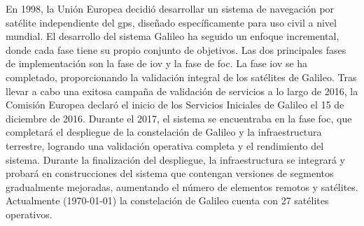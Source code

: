 \begin{justify}
    En 1998, la Unión Europea decidió desarrollar un sistema de navegación por satélite independiente del \gls{gps}, diseñado específicamente
    para uso civil a nivel mundial. El desarrollo del sistema Galileo ha seguido un enfoque incremental, donde cada fase tiene su propio conjunto de objetivos. Las dos principales
    fases de implementación son la fase de \gls{iov} y la fase de \gls{foc}. La fase \gls{iov} se ha completado, proporcionando la validación
    integral de los satélites de Galileo. Tras llevar a cabo una exitosa campaña de validación de servicios a lo largo de 2016, la Comisión
    Europea declaró el inicio de los Servicios Iniciales de Galileo el 15 de diciembre de 2016. Durante el 2017, el sistema se encuentraba en la fase \gls{foc}, que completará el
    despliegue de la constelación de Galileo y la infraestructura terrestre, logrando una validación operativa completa y el rendimiento del sistema. Durante la finalización
    del despliegue, la infraestructura se integrará y probará en construcciones del sistema que contengan versiones de segmentos gradualmente mejoradas, aumentando el número
    de elementos remotos y satélites. Actualmente (\today) la constelación de Galileo cuenta con 27 satélites operativos.
\end{justify}